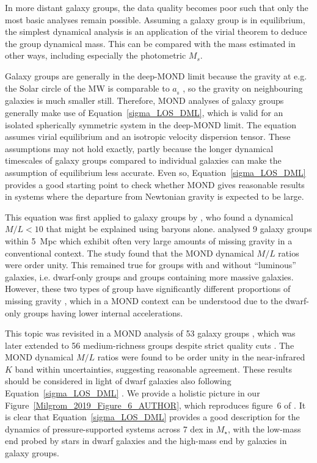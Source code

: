 \documentclass[fleqn,usenatbib,useAMS,onecolumn]{mnras} %
\begin{document}
In more distant galaxy groups, the data quality becomes poor such that only the most basic analyses remain possible. Assuming a galaxy group is in equilibrium, the simplest dynamical analysis is an application of the virial theorem to deduce the group dynamical mass. This can be compared with the mass estimated in other ways, including especially the photometric $M_s$.

Galaxy groups are generally in the deep-MOND limit because the gravity at e.g. the Solar circle of the MW is comparable to $a_{_0}$ \citep{Klioner_2021}, so the gravity on neighbouring galaxies is much smaller still. Therefore, MOND analyses of galaxy groups generally make use of Equation~\ref{sigma_LOS_DML}, which is valid for an isolated spherically symmetric system in the deep-MOND limit. The equation assumes virial equilibrium and an isotropic velocity dispersion tensor. These assumptions may not hold exactly, partly because the longer dynamical timescales of galaxy groups compared to individual galaxies can make the assumption of equilibrium less accurate. Even so, Equation~\ref{sigma_LOS_DML} provides a good starting point to check whether MOND gives reasonable results in systems where the departure from Newtonian gravity is expected to be large.

This equation was first applied to galaxy groups by \citet{Milgrom_1998}, who found a dynamical $M/L < 10$ that might be explained using baryons alone. \citet{Milgrom_2002} analysed 9 galaxy groups within 5~Mpc which exhibit often very large amounts of missing gravity in a conventional context. The study found that the MOND dynamical $M/L$ ratios were order unity. This remained true for groups with and without ``luminous'' galaxies, i.e. dwarf-only groups and groups containing more massive galaxies. However, these two types of group have significantly different proportions of missing gravity \citep{Tully_2002}, which in a MOND context can be understood due to the dwarf-only groups having lower internal accelerations.

This topic was revisited in a MOND analysis of 53 galaxy groups \citep{Milgrom_2018}, which was later extended to 56 medium-richness groups despite strict quality cuts \citep{Milgrom_2019}. The MOND dynamical $M/L$ ratios were found to be order unity in the near-infrared $K$ band within uncertainties, suggesting reasonable agreement. These results should be considered in light of dwarf galaxies also following Equation~\ref{sigma_LOS_DML} \citep[e.g.][]{McGaugh_2021}. We provide a holistic picture in our Figure~\ref{Milgrom_2019_Figure_6_AUTHOR}, which reproduces figure~6 of \citet{Milgrom_2019}. It is clear that Equation~\ref{sigma_LOS_DML} provides a good description for the dynamics of pressure-supported systems across 7 dex in $M_{\star}$, with the low-mass end probed by stars in dwarf galaxies and the high-mass end by galaxies in galaxy groups.
\end{document}
